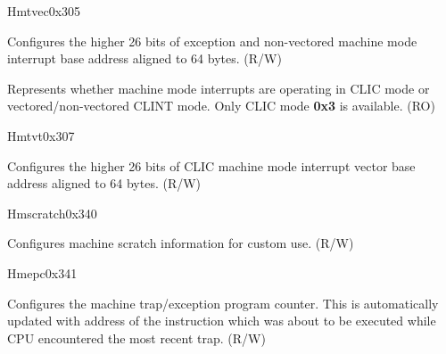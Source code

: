 \begin{register}{H}{mtvec}{0x305}\label{regdesc:MTVEC}
%
%
%
\regnewline%
\begin{regdesc}\begin{reglist}
\label{fielddesc:MTVECBASE}\item [BASE] Configures the higher 26 bits of exception and non-vectored machine mode interrupt base address aligned to 64 bytes. (R/W)
\label{fielddesc:MTVECMODE}\item [MODE] Represents whether machine mode interrupts are operating in CLIC mode or vectored/non-vectored CLINT mode. Only CLIC mode \textbf{0x3} is available. (RO)
\end{reglist}\end{regdesc}
\end{register}

\begin{register}{H}{mtvt}{0x307}\label{regdesc:MTVT}
%
%
\regnewline%
\begin{regdesc}\begin{reglist}
\label{fielddesc:MTVTBASE}\item [BASE] Configures the higher 26 bits of CLIC machine mode interrupt vector base address aligned to 64 bytes. (R/W)
\end{reglist}\end{regdesc}
\end{register}

\begin{register}{H}{mscratch}{0x340}\label{regdesc:MSCRATCH}
%
\regnewline%
\begin{regdesc}\begin{reglist}
\label{fielddesc:MSCRATCH}\item [MSCRATCH] Configures machine scratch information for custom use. (R/W)
\end{reglist}\end{regdesc}
\end{register}

\begin{register}{H}{mepc}{0x341}\label{regdesc:MEPC}
%
\regnewline%
\begin{regdesc}\begin{reglist}
\label{fielddesc:MEPC}\item [MEPC] Configures the machine trap/exception program counter. This is automatically updated with address of the instruction which was about to be executed while CPU encountered the most recent trap. (R/W)
\end{reglist}\end{regdesc}
\end{register}

